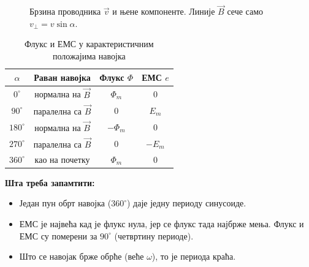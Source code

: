 \documentclass{article}
\begin{document}
\begin{figure}[H]
    \centering
    \caption{Брзина проводника $\vec v$ и њене компоненте. Линије $\vec B$ сече само $v_\perp = v\sin\alpha$.}
    \label{fig:brzina}
\end{figure}

\begin{table}[H]
    \centering
    \begin{tabular}{cccc}
        \toprule
        $\alpha$ & Раван навојка & Флукс $\Phi$ & ЕМС $e$ \\
        \midrule
        $0^\circ$   & нормална на $\vec B$   & $\Phi_m$  & $0$ \\
        $90^\circ$  & паралелна са $\vec B$  & $0$       & $E_m$ \\
        $180^\circ$ & нормална на $\vec B$   & $-\Phi_m$ & $0$ \\
        $270^\circ$ & паралелна са $\vec B$  & $0$       & $-E_m$ \\
        $360^\circ$ & као на почетку         & $\Phi_m$  & $0$ \\
        \bottomrule
    \end{tabular}
    \caption{Флукс и ЕМС у карактеристичним положајима навојка}
    \label{tab:polozaji}
\end{table}

\textbf{Шта треба запамтити:}
\begin{itemize}
    \item Један пун обрт навојка ($360^\circ$) даје једну периоду синусоиде.
    \item ЕМС је највећа кад је флукс нула, јер се флукс тада најбрже мења. Флукс и ЕМС су померени за $90^\circ$ (четвртину периоде).
    \item Што се навојак брже обрће (веће $\omega$), то је периода краћа.
\end{itemize}
\end{document}
